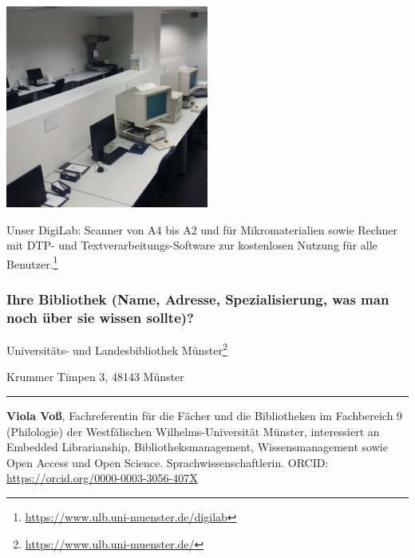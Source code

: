 \begin{center}
\includegraphics[width=0.5\textwidth]{ulb-muenster/img/DigiLab.jpg}
\end{center}

Unser DigiLab: Scanner von A4 bis A2 und für Mikromaterialien sowie
Rechner mit DTP- und Textverarbeitungs-Software zur kostenlosen Nutzung
für alle Benutzer.\footnote{\href{https://www.ulb.uni-muenster.de/digilab}{https://www.ulb.uni-muenster.de/digilab}}

\hypertarget{ihre-bibliothek-name-adresse-spezialisierung-was-man-noch-uxfcber-sie-wissen-sollte}{%
\subsubsection*{Ihre Bibliothek (Name, Adresse, Spezialisierung, was man noch
über sie wissen
sollte)?}\label{ihre-bibliothek-name-adresse-spezialisierung-was-man-noch-uxfcber-sie-wissen-sollte}}

Universitäts- und Landesbibliothek Münster\footnote{\href{https://www.ulb.uni-muenster.de/}{https://www.ulb.uni-muenster.de/}}

Krummer Timpen 3, 48143 Münster

\begin{center}\rule{0.5\linewidth}{\linethickness}\end{center}

\textbf{Viola Voß}, Fachreferentin für die Fächer und die Bibliotheken
im Fachbereich 9 (Philologie) der Westfälischen Wilhelms-Universität
Münster, interessiert an Embedded Librarianship, Bibliotheksmanagement,
Wissensmanagement sowie Open Access und Open Science.
Sprachwissenschaftlerin. ORCID:
\href{https://orcid.org/0000-0003-3056-407X}{https://orcid.org/0000-0003-3056-407X}